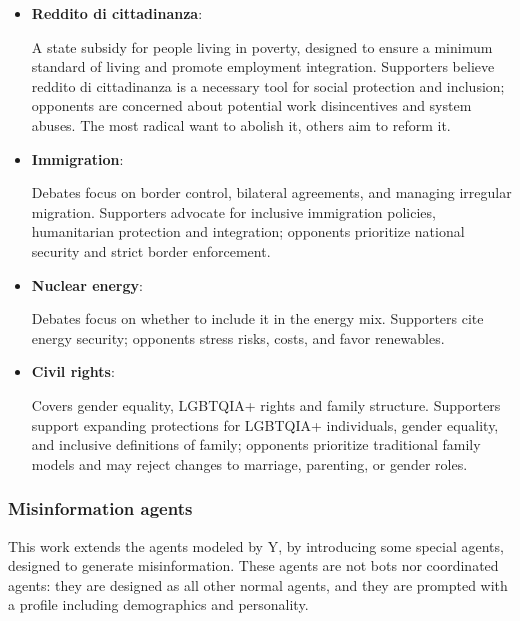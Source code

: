 \begin{itemize}
    \item \textbf{Reddito di cittadinanza}:
        \begin{tcolorbox}[prompt]
            A state subsidy for people living in poverty, designed to ensure a minimum standard of living and promote employment integration. Supporters believe reddito di cittadinanza is a necessary tool for social protection and inclusion; opponents are concerned about potential work disincentives and system abuses. The most radical want to abolish it, others aim to reform it.
        \end{tcolorbox}

    \item \textbf{Immigration}:
        \begin{tcolorbox}[prompt]
            Debates focus on border control, bilateral agreements, and managing irregular migration. Supporters advocate for inclusive immigration policies, humanitarian protection and integration; opponents prioritize national security and strict border enforcement.
        \end{tcolorbox}

    \item \textbf{Nuclear energy}:
        \begin{tcolorbox}[prompt]
            Debates focus on whether to include it in the energy mix. Supporters cite energy security; opponents stress risks, costs, and favor renewables.
        \end{tcolorbox}

    \item \textbf{Civil rights}:
        \begin{tcolorbox}[prompt]
            Covers gender equality, LGBTQIA+ rights and family structure. Supporters support expanding protections for LGBTQIA+ individuals, gender equality, and inclusive definitions of family; opponents prioritize traditional family models and may reject changes to marriage, parenting, or gender roles.
        \end{tcolorbox}
    
\end{itemize}



\subsubsection{Misinformation agents}
This work extends the agents modeled by Y, by introducing some special agents, designed to generate misinformation.
These agents are not bots nor coordinated agents: they are designed as all other normal agents, and they are prompted with a profile including demographics and personality.

